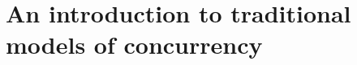 \chapter{An introduction to traditional models of concurrency}
\label{chap:traditional-models-for-concurrency}




